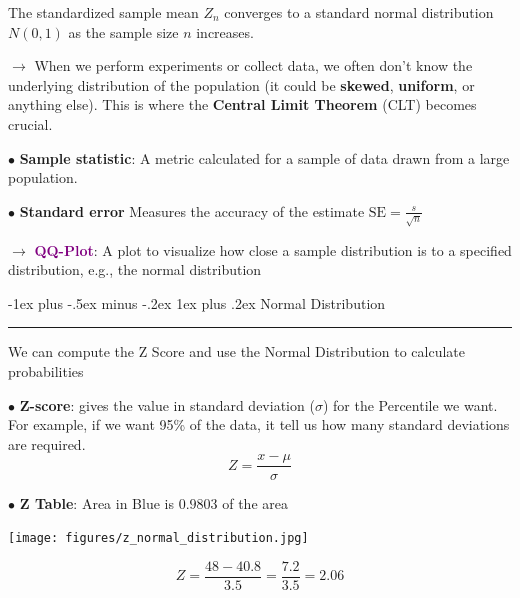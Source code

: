 \documentclass[letterpaper, 10.5pt,landscape]{article}
\makeatletter
\renewcommand{\subsubsection}{\@startsection{subsubsection}{3}{0mm}%
                                {-1ex plus -.5ex minus -.2ex}%
                                {1ex plus .2ex}%
                                {\normalfont\small\bfseries}}
\makeatother
\begin{document}
\begin{multicols*}{3}
The standardized sample mean $Z_{n}$ converges to a standard normal distribution $N(0,1)$ as the sample size 
$n$ increases.

$\rightarrow$ When we perform experiments or collect data, we often don't know the underlying distribution of the population (it could be \textbf{skewed}, \textbf{uniform}, or anything else). This is where the \textbf{Central Limit Theorem} (CLT) becomes crucial.


$\bullet$ \textbf{Sample statistic}: 
A metric calculated for a sample of data drawn from a large population.

$\bullet$ \textbf{Standard error} Measures the accuracy of the estimate \( \text{SE} = \frac{s}{\sqrt{n}}\)

\vspace{3pt}
$\rightarrow$ \textcolor{purple}{\textbf{QQ-Plot}}: A plot to visualize how close a sample distribution is to a specified distribution, e.g., the normal distribution



\subsubsection{Normal Distribution} {\color{teal}\hrule height 0.5pt} \smallskip

We can compute the Z Score and use the Normal Distribution to calculate probabilities


\vspace{2pt}
$\bullet$ \textbf{Z-score}: gives the value in standard deviation ($\sigma$) for the Percentile we want. For example, if we want 95\% of the data, it tell us how many standard deviations are required. 
\vspace{-4pt}
\[\boxed{
Z = \frac{x - \mu}{\sigma}
}\]
\vspace{-4pt}

$\bullet$ \textbf{Z Table}: Area in Blue is $0.9803$ of the area
\vspace{-4pt}
\begin{center}
    \begin{minipage}{0.46\linewidth}
    \texttt{[image: figures/z\_normal\_distribution.jpg]}
    \end{minipage}
\end{center}
\vspace{-4pt}
\vspace{-4pt}
\[\boxed{
Z = \frac{48 - 40.8}{3.5} = \frac{7.2}{3.5} = 2.06
}\]



\end{multicols*}
\end{document}
